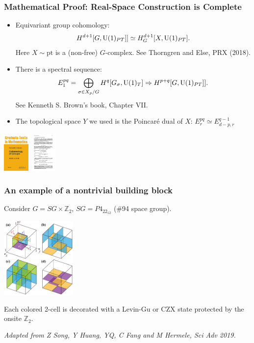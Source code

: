 \documentclass[xcolor=table, aspectratio=169,ignorenonframetext]{beamer}
\newcommand{\uone}{\text U(1)}
\begin{document}
\begin{frame}
\frametitle{Mathematical Proof: Real-Space Construction is Complete}
\begin{itemize}
\item Equivariant group cohomology:
\[H^{d+1}[G, \uone_{PT}]]\simeq H^{d+1}_G[X, \uone_{PT}].\]
Here $X\sim\text{pt}$ is a (non-free) $G$-complex. See Thorngren and Else, PRX (2018).
\item There is a spectral sequence:
\[E_1^{pq}=\bigoplus_{\sigma\in X_p/G}H^q[G_\sigma,\uone_T]\Rightarrow
 H^{p+q}[G, \uone_{PT}]].\]
See Kenneth S. Brown's book, Chapter VII.
\item The topological space $Y$ we used is the Poincar\'e dual of $X$: $E^{pq}_r\simeq E^{q-1}_{d-p,r}$
\end{itemize}
\begin{center}
	\includegraphics[height=2cm]{../spspt/brown_book}
	\includegraphics[height=2cm]{../spspt/brown_ss}
\end{center}
\end{frame}

\begin{frame}
\frametitle{An example of a nontrivial building block}
Consider $G=SG\times\mathbb Z_2$, $SG=P4_22_12$ (\#94 space group).
\begin{center}
\includegraphics[height=4cm]{../spspt/blocks}
\end{center}
Each colored 2-cell is decorated with a Levin-Gu or CZX state protected by the onsite $\mathbb Z_2$.

\emph{\small Adapted from Z Song, Y Huang, YQ, C Fang and M Hermele, Sci Adv 2019.}
\end{frame}
\end{document}
